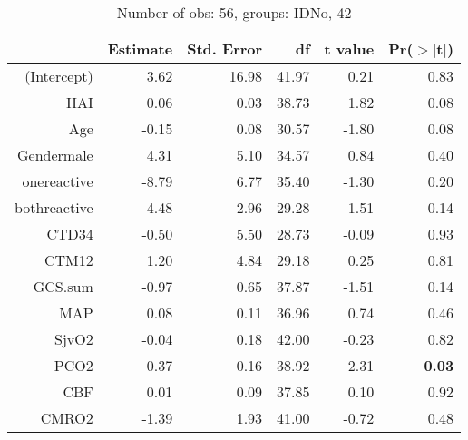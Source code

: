 \documentclass{article}
\begin{document}
\begin{table}[H]
\centering
\caption{Number of obs: 56, groups: IDNo, 42}
\label{tab: lmm3}
\begin{tabular}{rrrrrr}
  \hline
 & Estimate & Std. Error & df & t value & Pr($>$$|$t$|$) \\ 
  \hline
(Intercept) & 3.62 & 16.98 & 41.97 & 0.21 & 0.83 \\ 
  HAI & 0.06 & 0.03 & 38.73 & 1.82 & 0.08 \\ 
  Age & -0.15 & 0.08 & 30.57 & -1.80 & 0.08 \\ 
  Gendermale & 4.31 & 5.10 & 34.57 & 0.84 & 0.40 \\ 
  onereactive & -8.79 & 6.77 & 35.40 & -1.30 & 0.20 \\ 
  bothreactive & -4.48 & 2.96 & 29.28 & -1.51 & 0.14 \\ 
  CTD34 & -0.50 & 5.50 & 28.73 & -0.09 & 0.93 \\ 
  CTM12 & 1.20 & 4.84 & 29.18 & 0.25 & 0.81 \\ 
  GCS.sum & -0.97 & 0.65 & 37.87 & -1.51 & 0.14 \\ 
  MAP & 0.08 & 0.11 & 36.96 & 0.74 & 0.46 \\ 
  SjvO2 & -0.04 & 0.18 & 42.00 & -0.23 & 0.82 \\ 
  PCO2 & 0.37 & 0.16 & 38.92 & 2.31 & {\bf 0.03} \\ 
  CBF & 0.01 & 0.09 & 37.85 & 0.10 & 0.92 \\ 
  CMRO2 & -1.39 & 1.93 & 41.00 & -0.72 & 0.48 \\ 
   \hline
\end{tabular}
\end{table}
\end{document}
